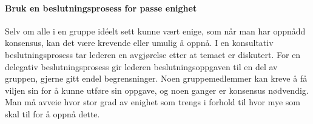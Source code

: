 \paragraph{Bruk en beslutningsprosess for passe enighet}
Selv om alle i en gruppe idéelt sett kunne vært enige, som når man har oppnådd konsensus, kan det være krevende eller umulig å oppnå.
I en konsultativ beslutningsprosess tar lederen en avgjørelse etter at temaet er diskutert.
For en delegativ beslutningsprosess gir lederen beslutningsoppgaven til en del av gruppen, gjerne gitt endel begrensninger.
Noen gruppemedlemmer kan kreve å få viljen sin for å kunne utføre sin oppgave, og noen ganger er konsensus nødvendig.
Man må avveie hvor stor grad av enighet som trengs i forhold til hvor mye som skal til for å oppnå dette.